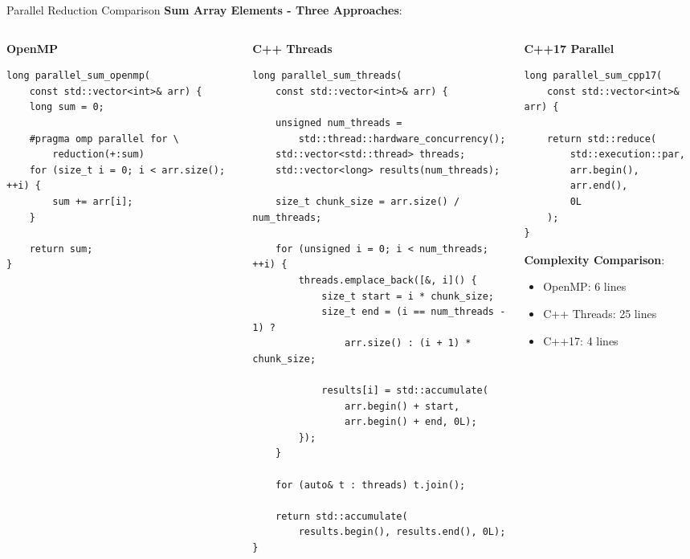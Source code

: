 \begin{frame}[fragile]{ Parallel Reduction Comparison}
	\textbf{Sum Array Elements - Three Approaches}:
	\begin{columns}
		\begin{column}{0.33\textwidth}
			\textbf{OpenMP}
			\begin{verbatim}
long parallel_sum_openmp(
    const std::vector<int>& arr) {
    long sum = 0;

    #pragma omp parallel for \
        reduction(+:sum)
    for (size_t i = 0; i < arr.size(); ++i) {
        sum += arr[i];
    }

    return sum;
}
			\end{verbatim}
		\end{column}
		\begin{column}{0.33\textwidth}
			\textbf{C++ Threads}
			\begin{verbatim}
long parallel_sum_threads(
    const std::vector<int>& arr) {

    unsigned num_threads =
        std::thread::hardware_concurrency();
    std::vector<std::thread> threads;
    std::vector<long> results(num_threads);

    size_t chunk_size = arr.size() / num_threads;

    for (unsigned i = 0; i < num_threads; ++i) {
        threads.emplace_back([&, i]() {
            size_t start = i * chunk_size;
            size_t end = (i == num_threads - 1) ?
                arr.size() : (i + 1) * chunk_size;

            results[i] = std::accumulate(
                arr.begin() + start,
                arr.begin() + end, 0L);
        });
    }

    for (auto& t : threads) t.join();

    return std::accumulate(
        results.begin(), results.end(), 0L);
}
			\end{verbatim}
		\end{column}
		\begin{column}{0.33\textwidth}
			\textbf{C++17 Parallel}
			\begin{verbatim}
long parallel_sum_cpp17(
    const std::vector<int>& arr) {

    return std::reduce(
        std::execution::par,
        arr.begin(),
        arr.end(),
        0L
    );
}
			\end{verbatim}

			\vspace{2em}
			\textbf{Complexity Comparison}:
			\begin{itemize}
				\item OpenMP: 6 lines
				\item C++ Threads: 25 lines
				\item C++17: 4 lines
			\end{itemize}
		\end{column}
	\end{columns}
\end{frame}
